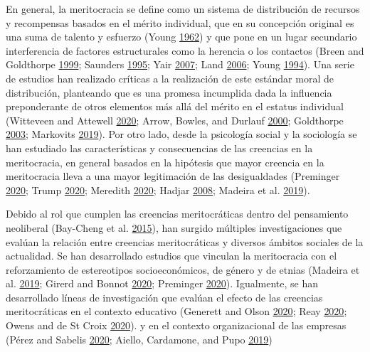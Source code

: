 \documentclass[
]{article}
\begin{document}
En general, la meritocracia se define como un sistema de distribución de
recursos y recompensas basados en el mérito individual, que en su
concepción original es una suma de talento y esfuerzo (Young
\protect\hyperlink{ref-young_rise_1962}{1962}) y que pone en un lugar
secundario interferencia de factores estructurales como la herencia o
los contactos (Breen and Goldthorpe
\protect\hyperlink{ref-breenClassInequalityMeritocracy1999}{1999};
Saunders \protect\hyperlink{ref-saundersMightBritainBe1995}{1995}; Yair
\protect\hyperlink{ref-yairMeritocracy2007}{2007}; Land
\protect\hyperlink{ref-landWeSatTable2006}{2006}; Young
\protect\hyperlink{ref-youngRiseMeritocracy1994}{1994}). Una serie de
estudios han realizado críticas a la realización de este estándar moral
de distribución, planteando que es una promesa incumplida dada la
influencia preponderante de otros elementos más allá del mérito en el
estatus individual (Witteveen and Attewell
\protect\hyperlink{ref-WitteveenReconsideringmeritocraticpower2020a}{2020};
Arrow, Bowles, and Durlauf
\protect\hyperlink{ref-arrow_meritocracy_2000}{2000}; Goldthorpe
\protect\hyperlink{ref-goldthorpe_myth_2003}{2003}; Markovits
\protect\hyperlink{ref-markovits_Meritocracy_2019}{2019}). Por otro
lado, desde la psicología social y la sociología se han estudiado las
características y consecuencias de las creencias en la meritocracia, en
general basados en la hipótesis que mayor creencia en la meritocracia
lleva a una mayor legitimación de las desigualdades (Preminger
\protect\hyperlink{ref-PremingerMeritocracyserviceethnocracy2020}{2020};
Trump \protect\hyperlink{ref-TrumpWhenwhyeconomic2020}{2020}; Meredith
\protect\hyperlink{ref-Meredithsocietydivisibleblessed2020}{2020};
Hadjar \protect\hyperlink{ref-hadjar_meritokratie_2008}{2008}; Madeira
et al.
\protect\hyperlink{ref-MadeiraPrimesConsequencesSystematic2019}{2019}).

Debido al rol que cumplen las creencias meritocráticas dentro del
pensamiento neoliberal (Bay-Cheng et al.
\protect\hyperlink{ref-Bay-ChengTrackingHomoOeconomicus2015}{2015}), han
surgido múltiples investigaciones que evalúan la relación entre
creencias meritocráticas y diversos ámbitos sociales de la actualidad.
Se han desarrollado estudios que vinculan la meritocracia con el
reforzamiento de estereotipos socioeconómicos, de género y de etnias
(Madeira et al.
\protect\hyperlink{ref-MadeiraPrimesConsequencesSystematic2019}{2019};
Girerd and Bonnot
\protect\hyperlink{ref-GirerdNeoliberalismIdeologicalBarrier2020}{2020};
Preminger
\protect\hyperlink{ref-PremingerMeritocracyserviceethnocracy2020}{2020}).
Igualmente, se han desarrollado líneas de investigación que evalúan el
efecto de las creencias meritocráticas en el contexto educativo
(Generett and Olson
\protect\hyperlink{ref-GenerettStoriesWeTell2020}{2020}; Reay
\protect\hyperlink{ref-ReayPerilsPenaltiesMeritocracy2020}{2020}; Owens
and de St Croix
\protect\hyperlink{ref-OwensENGINESSOCIALMOBILITY2020}{2020}). y en el
contexto organizacional de las empresas (Pérez and Sabelis
\protect\hyperlink{ref-PerezAdvancingcareersmerit2020}{2020}; Aiello,
Cardamone, and Pupo
\protect\hyperlink{ref-AielloNewevidencefirmuniversity2019}{2019})
\end{document}
